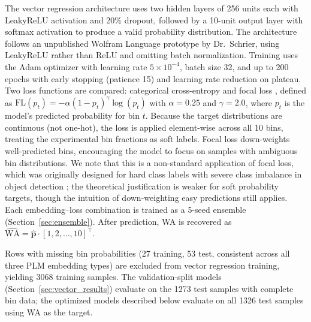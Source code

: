 \documentclass[12pt]{article}
\begin{document}
The vector regression architecture uses two hidden layers of 256 units each with LeakyReLU activation and 20\% dropout, followed by a 10-unit output layer with softmax activation to produce a valid probability distribution.
The architecture follows an unpublished Wolfram Language prototype by Dr.\ Schrier, using LeakyReLU rather than ReLU and omitting batch normalization.
Training uses the Adam optimizer with learning rate $5 \times 10^{-4}$, batch size 32, and up to 200 epochs with early stopping (patience 15) and learning rate reduction on plateau.
Two loss functions are compared: categorical cross-entropy and focal loss \citep{lin2017focal}, defined as $\text{FL}(p_t) = -\alpha(1-p_t)^\gamma \log(p_t)$ with $\alpha = 0.25$ and $\gamma = 2.0$, where $p_t$ is the model's predicted probability for bin $t$.
Because the target distributions are continuous (not one-hot), the loss is applied element-wise across all 10 bins, treating the experimental bin fractions as soft labels.
Focal loss down-weights well-predicted bins, encouraging the model to focus on samples with ambiguous bin distributions.
We note that this is a non-standard application of focal loss, which was originally designed for hard class labels with severe class imbalance in object detection \citep{lin2017focal}; the theoretical justification is weaker for soft probability targets, though the intuition of down-weighting easy predictions still applies.
Each embedding--loss combination is trained as a 5-seed ensemble (Section~\ref{sec:ensemble}).
After prediction, WA is recovered as $\hat{\text{WA}} = \hat{\mathbf{p}} \cdot [1, 2, \ldots, 10]^\top$.

Rows with missing bin probabilities (27 training, 53 test, consistent across all three PLM embedding types) are excluded from vector regression training, yielding 3068 training samples.
The validation-split models (Section~\ref{sec:vector_results}) evaluate on the 1273 test samples with complete bin data; the optimized models described below evaluate on all 1326 test samples using WA as the target.
\end{document}
